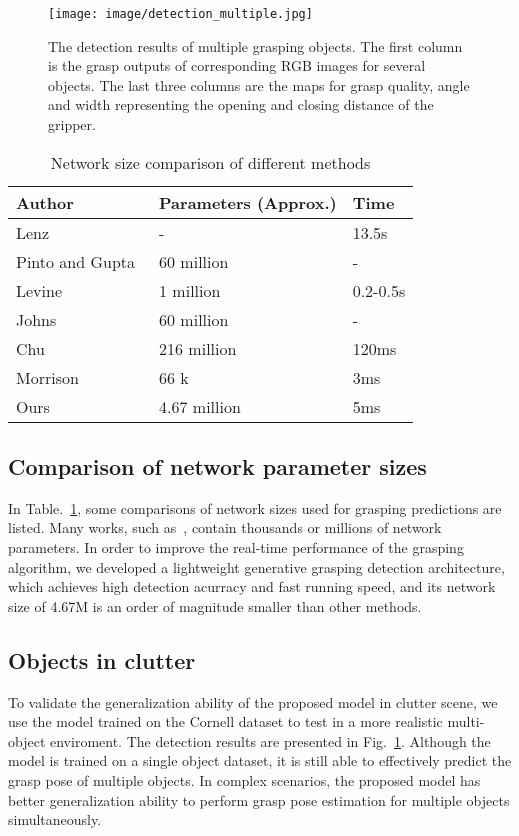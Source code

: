 \documentclass[journal]{IEEEtran}
\begin{document}
\begin{figure}[t!]
	\centering  
	\texttt{[image: image/detection\_multiple.jpg]}
	\caption{The detection results of multiple grasping objects. The first column is the grasp outputs of corresponding RGB images for several objects. The last three columns are the maps for grasp quality, angle and width representing the opening and closing distance of the gripper.}
	\label{fig:detection_multiple}
\end{figure}

\begin{table}[htbp]
	\caption{Network size comparison of different methods}
	\begin{center}
		\begin{tabular}{p{80pt}|p{80pt}|p{40pt}}
			\hline
			\textbf{Author}&\textbf{Parameters (Approx.)}&{\textbf{Time}}   \\
			\hline
			Lenz~\cite{lenz}&-& 13.5s\\
			Pinto and Gupta~\cite{pinto}&60 million& -\\
			Levine~\cite{levine}&1 million& 0.2-0.5s\\
			Johns~\cite{johns}&60 million& -\\
			Chu~\cite{chu}& 216 million& 120ms\\
			Morrison~\cite{ggcnn}& 66 k & 3ms\\
\hline
			Ours& 4.67 million & 5ms\\
			\hline
		\end{tabular}
	\end{center}
	\label{tab:size}
\end{table}

\subsection{Comparison of network parameter sizes}
In Table.~\ref{tab:size}, some comparisons of network sizes used for grasping predictions are listed. Many works, such as~\cite{pinto,levine,johns,chu}, contain thousands or millions of network parameters. In order to improve the real-time performance of the grasping algorithm, we developed a lightweight generative grasping detection architecture, which achieves high detection acurracy and fast running speed, and its network size of 4.67M is an order of magnitude smaller than other methods.

\subsection{Objects in clutter}
To validate the generalization ability of the proposed model in clutter scene, we use the model trained on the Cornell dataset to test in a more realistic multi-object enviroment. The detection results are presented in Fig.~\ref{fig:detection_multiple}. Although the model is trained on a single object dataset, it is still able to effectively predict the grasp pose of multiple objects. In complex scenarios, the proposed model has better generalization ability to perform grasp pose estimation for multiple objects simultaneously.
\end{document}
